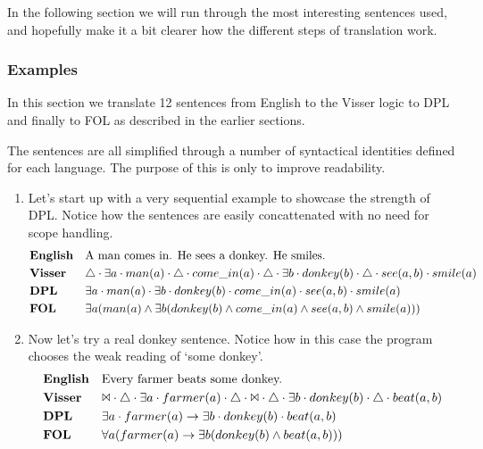 \documentclass[12pt]{article}
\begin{document}
In the following section we will run through the most interesting sentences used, and hopefully make it a bit clearer how the different steps of translation work.

\subsubsection{Examples}

In this section we translate 12 sentences from English to the Visser logic to DPL and finally to FOL as described in the earlier sections.

The sentences are all simplified through a number of syntactical identities defined for each language. The purpose of this is only to improve readability.

\begin{enumerate}
\item
Let's start up with a very sequential example to showcase the strength of DPL. Notice how the sentences are easily concattenated with no need for scope handling.
\begin{align*}
&\text{\textbf{English}}&&\text{A man comes in. He sees a donkey. He smiles.} \\
&\text{\textbf{Visser}}&&\triangle \cdot \exists a \cdot man(a) \cdot \triangle \cdot come\_in(a) \cdot \triangle \cdot \exists b \cdot donkey(b) \cdot \triangle \cdot see(a,b) \cdot smile(a) \\
&\text{\textbf{DPL}}&&\exists a \cdot man(a) \cdot \exists b \cdot donkey(b) \cdot come\_in(a) \cdot see(a,b) \cdot smile(a) \\
&\text{\textbf{FOL}}&&\exists a(man(a) \wedge \exists b(donkey(b) \wedge come\_in(a) \wedge see(a,b) \wedge smile(a))) \\
\end{align*}
\item
Now let's try a real donkey sentence. Notice how in this case the program chooses the weak reading of `some donkey'.
\begin{align*}
&\text{\textbf{English}}&&\text{Every farmer beats some donkey.} \\
&\text{\textbf{Visser}}&&\Bowtie \cdot \triangle \cdot \exists a \cdot farmer(a) \cdot \triangle \cdot \Bowtie \cdot \triangle \cdot \exists b \cdot donkey(b) \cdot \triangle \cdot beat(a,b) \\
&\text{\textbf{DPL}}&&\exists a \cdot farmer(a) \rightarrow \exists b \cdot donkey(b) \cdot beat(a,b) \\
&\text{\textbf{FOL}}&&\forall a(farmer(a) \rightarrow \exists b(donkey(b) \wedge beat(a,b))) \\

\end{align*}
\end{enumerate}
\end{document}

